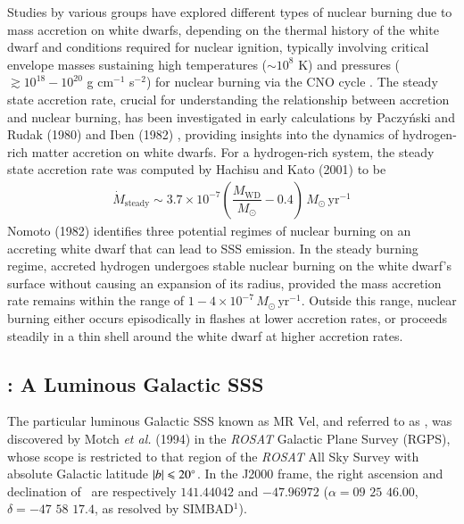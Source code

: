     Studies by various groups have explored different types of nuclear burning due to mass accretion on white dwarfs, depending on the thermal history of the white dwarf and conditions required for nuclear ignition, typically involving critical envelope masses %
    sustaining high temperatures ($\sim 10^8$ K) and pressures ($\gtrsim 10^{18}-10^{20}$ g cm$^{-1}$ s$^{-2}$) for nuclear burning via the CNO cycle \cite{paczynski78,prialnik78,sion79,sienkiewicz80,nomoto82,fujimoto82a,fujimoto82b,iben82,prialnik95,macdonald83}. The steady state accretion rate, crucial for understanding the relationship between accretion and nuclear burning, has been investigated in early calculations by Paczy\'{n}ski and Rudak (1980) \cite{paczynski80} and Iben (1982) \cite{iben82}, providing insights into the dynamics of hydrogen-rich matter accretion on white dwarfs. For a hydrogen-rich system, the steady state accretion rate was computed by Hachisu and Kato (2001) \cite{hachisu2001} to be
	\begin{align}
		\dot{M}_\text{steady}\sim 3.7\times 10^{-7}\left( \dfrac{M_\text{WD}}{M_\odot}-0.4 \right)\,M_\odot\,\text{yr}^{-1} \label{eqn:steady-mass-accr}
	\end{align}
	Nomoto (1982) \cite{nomoto82} identifies three potential regimes of nuclear burning on an accreting white dwarf that can lead to SSS emission. In the steady burning regime, accreted hydrogen undergoes stable nuclear burning on the white dwarf's surface without causing an expansion of its radius, provided the mass accretion rate remains within the range of $1-4\times 10^{-7}\,M_\odot\,\text{yr}^{-1}$. Outside this range, nuclear burning either occurs episodically in flashes at lower accretion rates, or proceeds steadily in a thin shell around the white dwarf at higher accretion rates. %
	
	\subsection{\source: A Luminous Galactic SSS}
	The particular luminous Galactic SSS known as MR Vel, and referred to as \source, was discovered by Motch \textit{et al.} (1994) \cite{motch1994} in the \textit{ROSAT} Galactic Plane Survey (RGPS), whose scope is restricted to that region of the \textit{ROSAT} All Sky Survey \cite{voges1993rosat} with absolute Galactic latitude $|b|\leqslant 20\degree$. In the J2000 frame, the right ascension and declination of \source\ are respectively $141.44042$ and $-47.96972$ ($\alpha=09$ $25$ $46.00$, $\delta=-47$ $58$ $17.4$, as resolved by SIMBAD$^1$).
	
